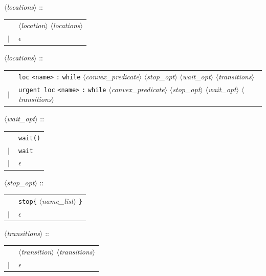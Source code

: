 \documentclass[a4paper,11pt]{report}
\newcommand{\emptystring}{$\epsilon$}
\newcommand{\nt}[1]{$\langle$\emph{#1}$\rangle$}
\newcommand{\regleGrammaire}[1]{\bigskip \noindent \nt{#1} :: \\}
\newcommand{\npec}[1]{\textcolor{green!50!black}{#1}}
\newcommand{\styleIMI}[1]{\textcolor{imicolor}{\texttt{#1}}}
\begin{document}
\regleGrammaire{locations}
\begin{tabular}{l l}
	\  & \nt{location} \nt{locations} \\
	$|$ & \emptystring \\
\end{tabular}

\regleGrammaire{locations}
\begin{tabular}{l l}
	\  & \styleIMI{loc} \styleIMI{<name>} \styleIMI{:} \styleIMI{while} \nt{convex\_predicate} \nt{stop\_opt} \npec{\nt{wait\_opt}} \nt{transitions} \\
	$|$ & \styleIMI{urgent loc} \styleIMI{<name>} \styleIMI{:} \styleIMI{while} \nt{convex\_predicate} \nt{stop\_opt} \npec{\nt{wait\_opt}} \nt{transitions} \\
\end{tabular}

\regleGrammaire{\npec{wait\_opt}}
\begin{tabular}{l l}
	\ & \npec{\styleIMI{wait()}} \\
	$|$ & \npec{\styleIMI{wait}} \\
	$|$ & \npec{\emptystring} \\
\end{tabular}

\regleGrammaire{stop\_opt}
\begin{tabular}{l l}
	\ & \styleIMI{stop\{} \nt{name\_list} \styleIMI{\}} \\
	$|$ & \emptystring \\
\end{tabular}

	
\regleGrammaire{transitions}
\begin{tabular}{l l}
	\  & \nt{transition} \nt{transitions} \\
	$|$ & \emptystring \\
\end{tabular}
\end{document}
